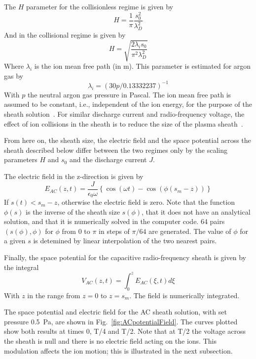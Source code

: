 The $H$ parameter for the collisionless regime is given by~\cite{Lieberman1988}
\begin{equation}
H = \frac1{\pi} \frac{s_0^2}{\lambda_D^2}
\end{equation}
And in the collisional regime is given by~\cite{Lieberman1989}
\begin{equation}
H = \sqrt{  \frac{2 \lambda_i s_0}{\pi^2 \lambda_D^2}  }
\end{equation}
Where $\lambda_i$ is the ion mean free path (in m). This parameter is estimated for argon gas by~\cite{Lieberman1989}
\begin{equation}\label{eq:lambda_i}
\lambda_i = (30 p /0.13332237)^{-1}
\end{equation}
With $p$ the neutral argon gas pressure in Pascal. The ion mean free path is assumed to be constant, i.e., independent of the ion energy, for the purpose of the sheath solution~\cite{Lieberman1989}. For similar discharge current and radio-frequency voltage, the effect of ion collisions in the sheath is to reduce the size of the plasma sheath~\cite{Lieberman1989}.

From here on, the sheath size, the electric field and the space potential across the sheath described below differ between the two regimes only by the scaling parameters $H$ and $s_0$ and the discharge current $J$.

The electric field in the z-direction is given by 
\begin{equation}
E_{AC}(z,t) = \frac{J}{\epsilon_0 \omega} \left \{ \cos(\omega t) - \cos(\phi(s_m - z)) \right \} 
\end{equation}
If $s(t)<s_m-z$, otherwise the electric field is zero. Note that the function $\phi(s)$ is the inverse of the sheath size $s(\phi)$, that it does not have an analytical solution, and that it is numerically solved in the computer code. 64 pairs $(s(\phi), \phi)$ for $\phi$ from 0 to $\pi$ in steps of $\pi/64$ are generated. The value of $\phi$ for a given $s$ is detemined by linear interpolation of the two nearest pairs.   

Finally, the space potential for the capacitive radio-frequency sheath is given by the integral
\begin{equation}
V_{AC}(z,t) = \int_{0}^{z} E_{AC}(\xi, t) d\xi
\end{equation}
With $z$ in the range from $z=0$ to $z=s_m$. The field is numerically integrated.  

The space potential and electric field for the AC sheath solution, with set pressure 0.5~Pa, are shown in Fig.~\ref{fig:ACpotentialField}. The curves plotted show both results at times 0, T/4 and T/2. Note that at T/2 the voltage across the sheath is null and there is no electric field acting on the ions. This modulation affects the ion motion; this is illustrated in the next subsection. 

